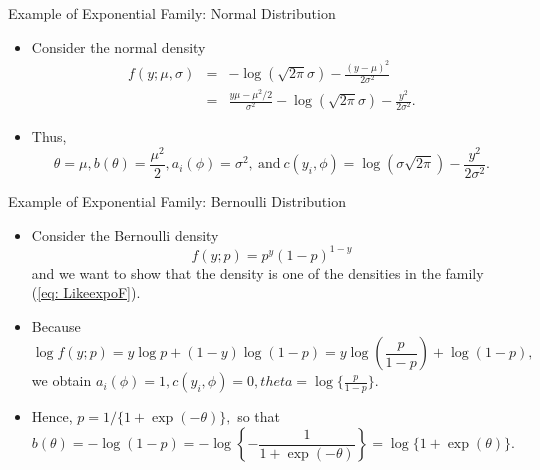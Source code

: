 \documentclass{beamer}
\begin{document}
               \begin{frame}{Example of Exponential Family: Normal Distribution}
        \begin{itemize}
            \item Consider the normal density
            \begin{eqnarray}
                 f(y; \mu, \sigma) & = & -\log\left(\sqrt{2\pi}\sigma\right) - \frac{(y-\mu)^2}{2\sigma^2} \nonumber\\
                 & = & \frac{y\mu-\mu^2/2}{\sigma^2} - \log\left(\sqrt{2\pi}\sigma\right) - \frac{y^2}{2\sigma^2}.
            \end{eqnarray}
            \item Thus,
            $$
            \theta = \mu, b(\theta) = \frac{\mu^2}{2}, a_{i}(\phi) = \sigma^2,\ \mbox{and}\ c(y_{i}, \phi) = \log(\sigma\sqrt{2\pi})-\frac{y^2}{2\sigma^2}.
            $$
        \end{itemize}
    \end{frame}
       

           \begin{frame}{Example of Exponential Family: Bernoulli Distribution}
        \begin{itemize}
            \item Consider the Bernoulli density
            $$f(y; p) = p^{y} (1-p)^{1-y}$$
            and we want to show that the density is one of the densities in the family (\ref{eq: LikeexpoF}).
           \item Because 
           $$\log f(y; p) = y \log p + (1-y)\log(1-p) = y\log (\frac{p}{1-p}) + \log(1-p),$$
           we obtain 
           $a_{i}(\phi) = 1, c(y_{i}, \phi) = 0, theta = \log\{\frac{p}{1-p}\}.$
           \item Hence,  $p = 1/\{1+\exp(-\theta)\},$ so that
             $$b(\theta) = -\log(1-p) = -\log\left\{-\frac{1}{1+\exp(-\theta)}\right\} = \log\{1+\exp(\theta)\}.$$
         
        \end{itemize}
    \end{frame}
    

    
    
\end{document}
